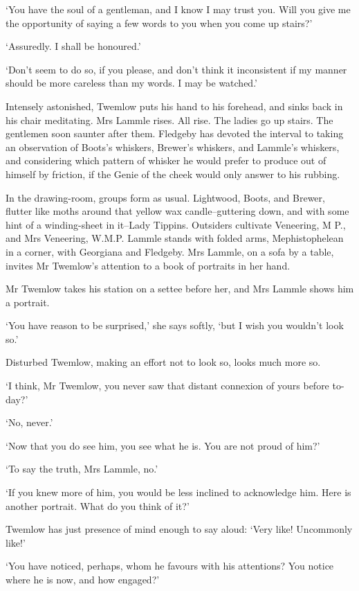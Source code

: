‘You have the soul of a gentleman, and I know I may trust you. Will you
give me the opportunity of saying a few words to you when you come up
stairs?’

‘Assuredly. I shall be honoured.’

‘Don’t seem to do so, if you please, and don’t think it inconsistent if
my manner should be more careless than my words. I may be watched.’

Intensely astonished, Twemlow puts his hand to his forehead, and sinks
back in his chair meditating. Mrs Lammle rises. All rise. The ladies go
up stairs. The gentlemen soon saunter after them. Fledgeby has devoted
the interval to taking an observation of Boots’s whiskers, Brewer’s
whiskers, and Lammle’s whiskers, and considering which pattern of
whisker he would prefer to produce out of himself by friction, if the
Genie of the cheek would only answer to his rubbing.

In the drawing-room, groups form as usual. Lightwood, Boots, and Brewer,
flutter like moths around that yellow wax candle--guttering down,
and with some hint of a winding-sheet in it--Lady Tippins. Outsiders
cultivate Veneering, M P., and Mrs Veneering, W.M.P. Lammle stands with
folded arms, Mephistophelean in a corner, with Georgiana and Fledgeby.
Mrs Lammle, on a sofa by a table, invites Mr Twemlow’s attention to a
book of portraits in her hand.

Mr Twemlow takes his station on a settee before her, and Mrs Lammle
shows him a portrait.

‘You have reason to be surprised,’ she says softly, ‘but I wish you
wouldn’t look so.’

Disturbed Twemlow, making an effort not to look so, looks much more so.

‘I think, Mr Twemlow, you never saw that distant connexion of yours
before to-day?’

‘No, never.’

‘Now that you do see him, you see what he is. You are not proud of him?’

‘To say the truth, Mrs Lammle, no.’

‘If you knew more of him, you would be less inclined to acknowledge him.
Here is another portrait. What do you think of it?’

Twemlow has just presence of mind enough to say aloud: ‘Very like!
Uncommonly like!’

‘You have noticed, perhaps, whom he favours with his attentions? You
notice where he is now, and how engaged?’

